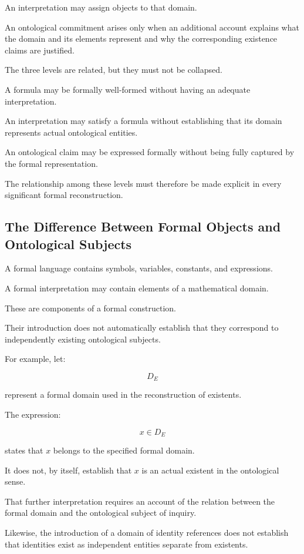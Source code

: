 An interpretation may assign
objects to that domain.

An ontological commitment arises
only when an additional account
explains what the domain
and its elements represent
and why the corresponding
existence claims are justified.

The three levels are related,
but they must not be collapsed.

A formula may be formally
well-formed without having
an adequate interpretation.

An interpretation may satisfy
a formula without establishing
that its domain represents
actual ontological entities.

An ontological claim may be
expressed formally without
being fully captured by
the formal representation.

The relationship among these
levels must therefore be made
explicit in every significant
formal reconstruction.

\subsection{The Difference Between Formal Objects and Ontological Subjects}

A formal language contains
symbols, variables, constants,
and expressions.

A formal interpretation
may contain elements
of a mathematical domain.

These are components
of a formal construction.

Their introduction does
not automatically establish
that they correspond
to independently existing
ontological subjects.

For example, let:

\[
    D_E
\]

represent a formal domain
used in the reconstruction
of existents.

The expression:

\[
    x\in D_E
\]

states that \(x\) belongs
to the specified formal domain.

It does not, by itself,
establish that \(x\)
is an actual existent
in the ontological sense.

That further interpretation
requires an account of
the relation between
the formal domain
and the ontological
subject of inquiry.

Likewise, the introduction
of a domain of identity
references does not establish
that identities exist
as independent entities
separate from existents.

